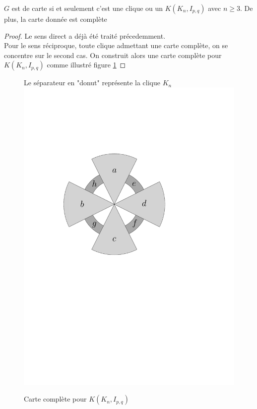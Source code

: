 \documentclass{scrartcl}
\begin{document}
\begin{flushleft}
\begin{lem}\label{trivPar3conn}
    $G$ est de carte si et seulement c'est une clique ou un $K(K_n, I_{p,q})$ avec $n \geq 3$. De plus, la carte
    donnée est complète
\end{lem}

\begin{proof}
    Le sens direct a déjà été traité précedemment.\\
    Pour le sens réciproque, toute clique admettant une carte complète, on se concentre sur le second cas. On construit
    alors une carte complète pour $K(K_n, I_{p,q})$ comme illustré figure \ref{KKnIpqmap}
\end{proof}

\begin{figure}[h]
    \caption{Carte complète pour $K(K_n, I_{p,q})$}\label{KKnIpqmap}
    \begin{center}
        Le séparateur en "donut" représente la clique $K_n$\\
        \includegraphics[page=\ipeFigKKnIpqcompl, scale = 0.5]{figs}
    \end{center}
\end{figure}


\end{flushleft}
\end{document}

